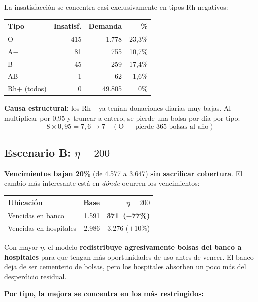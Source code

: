 \documentclass[11pt, a4paper]{article}
\begin{document}
La insatisfacción se concentra casi exclusivamente en tipos Rh negativos:

\begin{center}
\begin{tabular}{lrrr}
\toprule
\rowcolor{rowgray}\textbf{Tipo} & \textbf{Insatisf.} & \textbf{Demanda} & \textbf{\%}\\
\midrule
O$-$ & 415 & 1.778 & 23,3\% \\
A$-$ & 81 & 755 & 10,7\% \\
B$-$ & 45 & 259 & 17,4\% \\
AB$-$ & 1 & 62 & 1,6\% \\
\midrule
Rh$+$ (todos) & 0 & 49.805 & 0\% \\
\bottomrule
\end{tabular}
\end{center}

\textbf{Causa estructural:} los Rh$-$ ya tenían donaciones diarias muy bajas. Al multiplicar por 0,95 y truncar a entero, se pierde una bolsa por día por tipo:
$$8 \times 0{,}95 = 7{,}6 \to 7 \quad (\text{O$-$ pierde 365 bolsas al año})$$

\subsection{Escenario B: $\eta = 200$}

\textbf{Vencimientos bajan 20\%} (de 4.577 a 3.647) \textbf{sin sacrificar cobertura}. El cambio más interesante está en \emph{dónde} ocurren los vencimientos:

\begin{center}
\begin{tabular}{lrr}
\toprule
\rowcolor{rowgray}\textbf{Ubicación} & \textbf{Base} & \textbf{$\eta=200$}\\
\midrule
Vencidas en banco & 1.591 & \textbf{\color{accentgreen}371\ ($-$77\%)} \\
Vencidas en hospitales & 2.986 & 3.276 ($+$10\%) \\
\bottomrule
\end{tabular}
\end{center}

Con mayor $\eta$, el modelo \textbf{redistribuye agresivamente bolsas del banco a hospitales} para que tengan más oportunidades de uso antes de vencer. El banco deja de ser cementerio de bolsas, pero los hospitales absorben un poco más del desperdicio residual.

\textbf{Por tipo, la mejora se concentra en los más restringidos:}
\end{document}
